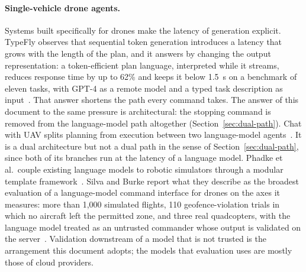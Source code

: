 \paragraph{Single-vehicle drone agents.} Systems built specifically for drones make the latency of
generation explicit. TypeFly observes that sequential token generation introduces a latency that
grows with the length of the plan, and it answers by changing the output representation: a
token-efficient plan language, interpreted while it streams, reduces response time by up to 62\%
and keeps it below 1.5~s on a benchmark of eleven tasks, with GPT-4 as a remote model and a typed
task description as input~\cite{typefly2024}. That answer shortens the path every command takes.
The answer of this document to the same pressure is architectural: the stopping command is removed
from the language-model path altogether (Section~\ref{sec:dual-path}). Chat with UAV splits
planning from execution between two language-model agents~\cite{chatwithuav2025}. It is a dual
architecture but not a dual path in the sense of Section~\ref{sec:dual-path}, since both of its
branches run at the latency of a language model. Phadke et al.\ couple existing language models to
robotic simulators through a modular template framework~\cite{phadke2024}. Silva and Burke report
what they describe as the broadest evaluation of a language-model command interface for drones on
the axes it measures: more than 1{,}000 simulated flights, 110 geofence-violation trials in which
no aircraft left the permitted zone, and three real quadcopters, with the language model treated as
an untrusted commander whose output is validated on the server~\cite{silva2026}. Validation
downstream of a model that is not trusted is the arrangement this document adopts; the models that
evaluation uses are mostly those of cloud providers.

